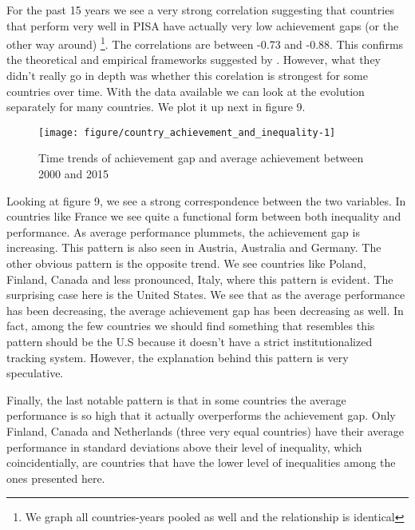 \documentclass[11pt, a4paper]{article}\usepackage[]{graphicx}\usepackage[]{color}
\begin{document}
For the past 15 years we see a very strong correlation suggesting that countries that perform very well in PISA have actually very low achievement gaps (or the other way around) \footnote{We graph all countries-years pooled as well and the relationship is identical}. The correlations are between -0.73 and -0.88. This confirms the theoretical and empirical frameworks suggested by \citet{werfhorst_mijs}. However, what they didn't really go in depth was whether this corelation is strongest for some countries over time. With the data available we can look at the evolution separately for many countries. We plot it up next in figure 9.

\begin{figure}
\begin{center}


{\centering \texttt{[image: figure/country\_achievement\_and\_inequality-1]} 

}



\caption{Time trends of achievement gap and average achievement between 2000 and 2015}
\end{center}
\end{figure}


Looking at figure 9, we see a strong correspondence between the two variables. In countries like France we see quite a functional form between both inequality and performance. As average performance plummets, the achievement gap is increasing. This pattern is also seen in Austria, Australia and Germany. The other obvious pattern is the opposite trend. We see countries like Poland, Finland, Canada and less pronounced, Italy, where this pattern is evident. The surprising case here is the United States. We see that as the average performance has been decreasing, the average achievement gap has been decreasing as well. In fact, among the few countries we should find something that resembles this pattern should be the U.S because it doesn't have a strict institutionalized tracking system. However, the explanation behind this pattern is very speculative.

Finally, the last notable pattern is that in some countries the average performance is so high that it actually overperforms the achievement gap. Only Finland, Canada and Netherlands (three very equal countries) have their average performance in standard deviations above their level of inequality, which coincidentially, are countries that have the lower level of inequalities among the ones presented here.
\end{document}
